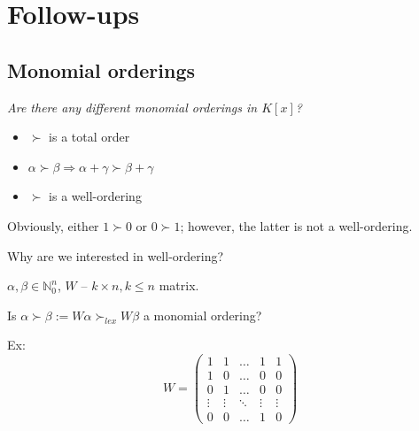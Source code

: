 \section{Follow-ups}
\subsection{Monomial orderings}
\begin{frame}
    \textit{Are there any different monomial orderings in $K\left[x\right]$?}

    \begin{itemize}
        \item $\succ$ is a total order 
        \item $\alpha \succ \beta \Rightarrow \alpha + \gamma \succ \beta + \gamma$
        \item $\succ$ is a well-ordering
    \end{itemize}

    Obviously, either $1\succ 0$ or $0 \succ 1$; however, the latter is not a well-ordering.

    Why are we interested in well-ordering?

\end{frame}

\begin{frame}
    $\alpha, \beta \in \mathbb{N}_0^n$, $W$ -- $k\times n, k\leq n$ matrix.
    
    Is $\alpha \succ \beta := W \alpha \succ_{lex} W\beta$ a monomial ordering?

    Ex:
    \[
        W = \begin{pmatrix} 1 & 1 &  \hdots & 1 & 1 \\ 1 & 0 & \hdots & 0  & 0 \\ 0 & 1 & \dots & 0  & 0 \\ \vdots & \vdots & \ddots &  \vdots & \vdots \\ 0 & 0 & \hdots & 1 & 0\end{pmatrix}
    \]
\end{frame}


